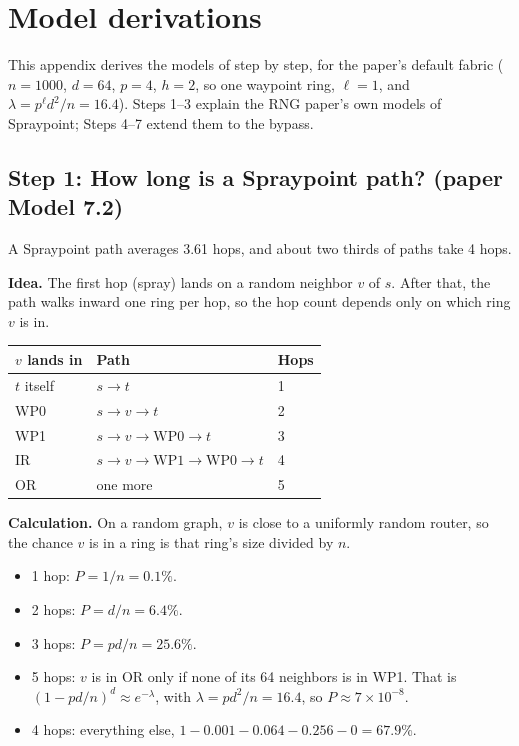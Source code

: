 \section{Model derivations}
\label{app:derivations}

This appendix derives the models of  step by step, for the paper's default fabric ($n = 1000$, $d = 64$, $p = 4$, $h = 2$, so one waypoint ring, $\ell = 1$, and $\lambda = p^{\ell} d^2/n = 16.4$). Steps 1--3 explain the RNG paper's own models of Spraypoint; Steps 4--7 extend them to the bypass.

\subsection{Step 1: How long is a Spraypoint path? (paper Model 7.2)}

A Spraypoint path averages 3.61 hops, and about two thirds of paths take 4 hops.

\textbf{Idea.} The first hop (spray) lands on a random neighbor $v$ of $s$. After that, the path walks inward one ring per hop, so the hop count depends only on which ring $v$ is in.

\begin{center}
\begin{tabular}{@{}lll@{}}
\toprule
$v$ lands in & Path & Hops \\
\midrule
$t$ itself & $s \to t$ & 1 \\
WP0 & $s \to v \to t$ & 2 \\
WP1 & $s \to v \to \text{WP0} \to t$ & 3 \\
IR & $s \to v \to \text{WP1} \to \text{WP0} \to t$ & 4 \\
OR & one more & 5 \\
\bottomrule
\end{tabular}
\end{center}

\textbf{Calculation.} On a random graph, $v$ is close to a uniformly random router, so the chance $v$ is in a ring is that ring's size divided by $n$.
\begin{itemize}
  \item 1 hop: $P = 1/n = 0.1\%$.
  \item 2 hops: $P = d/n = 6.4\%$.
  \item 3 hops: $P = p d / n = 25.6\%$.
  \item 5 hops: $v$ is in OR only if none of its 64 neighbors is in WP1. That is $(1 - pd/n)^d \approx e^{-\lambda}$, with $\lambda = p d^2 / n = 16.4$, so $P \approx 7 \times 10^{-8}$.
  \item 4 hops: everything else, $1 - 0.001 - 0.064 - 0.256 - 0 = 67.9\%$.
\end{itemize}

